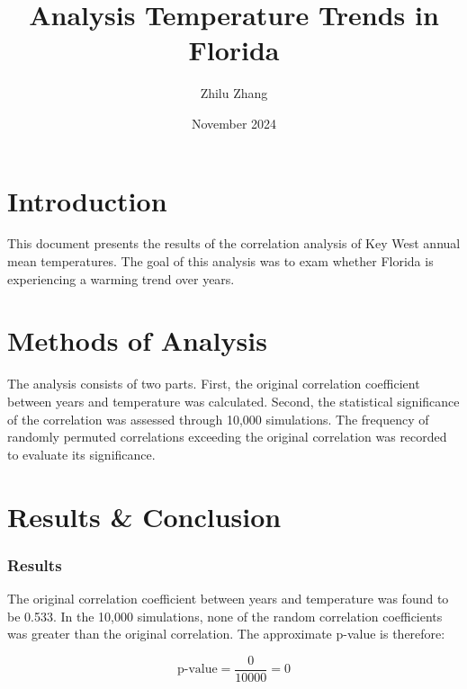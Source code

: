 \documentclass{article}
\title{Analysis Temperature Trends in Florida}
\author{Zhilu Zhang}
\date{November 2024}
\begin{document}
 
\maketitle
 
\section{Introduction}

\vspace{-0.5em}

This document presents the results of the correlation analysis of Key West annual mean temperatures. The goal of this analysis was to exam whether Florida is experiencing a warming trend over years.
 
\section{Methods of Analysis}

\vspace{-0.5em}

The analysis consists of two parts. First, the original correlation coefficient between years and temperature was calculated. Second, the statistical significance of the correlation was assessed through 10,000 simulations. The frequency of randomly permuted correlations exceeding the original correlation was recorded to evaluate its significance.

\section{Results \& Conclusion}

\vspace{-0.5em}

{\selectfont\subsubsection*{Results}

\vspace{-0.5em}

The original correlation coefficient between years and temperature was found to be 0.533. In the 10,000 simulations, none of the random correlation coefficients was greater than the original correlation. The approximate p-value is therefore:

\vspace{-0.5em}

\[

\text{p-value} = \frac{0}{10000} = 0

\]}
 
\end{document}
